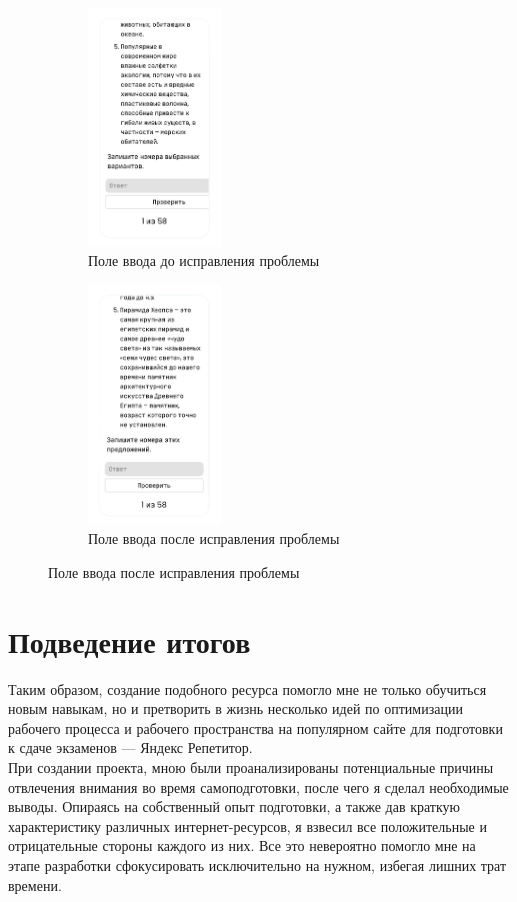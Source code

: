 \documentclass[a4paper, 12pt]{extarticle}
\begin{document}
\begin{enumerate}
\begin{figure}[h]
        \begin{subfigure}{.5\textwidth}
            \centering
            \includegraphics[width=100pt]{./img/inputBug.png}
            \caption{Поле ввода до исправления проблемы}
        \end{subfigure}
        \begin{subfigure}{.5\textwidth}
            \centering
            \includegraphics[width=100pt]{./img/input.png}
            \caption{Поле ввода после исправления проблемы}
        \end{subfigure}
    \end{figure}

\end{enumerate}
\newpage

\section{Подведение итогов}
Таким образом, создание подобного ресурса помогло мне не только обучиться новым
навыкам, но и претворить в жизнь несколько идей по оптимизации рабочего
процесса и рабочего пространства на популярном сайте для подготовки к сдаче
экзаменов — Яндекс Репетитор.
\\

При создании проекта, мною были проанализированы потенциальные причины
отвлечения внимания во время самоподготовки, после чего я сделал необходимые
выводы. Опираясь на собственный опыт подготовки, а также дав краткую
характеристику различных интернет-ресурсов, я взвесил все положительные и
отрицательные стороны каждого из них. Все это невероятно помогло мне на этапе
разработки сфокусировать исключительно на нужном, избегая лишних трат времени.
\\
\end{document}
